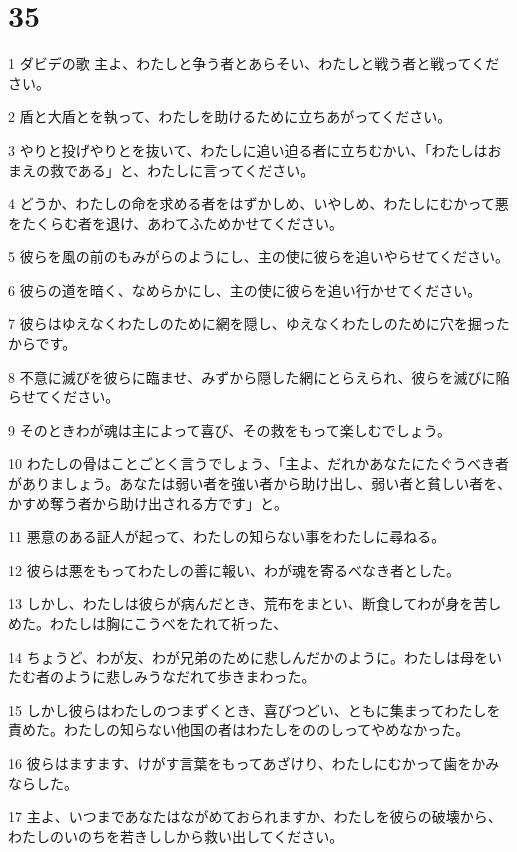 \chapter{35}

\par 1 ダビデの歌 主よ、わたしと争う者とあらそい、わたしと戦う者と戦ってください。
\par 2 盾と大盾とを執って、わたしを助けるために立ちあがってください。
\par 3 やりと投げやりとを抜いて、わたしに追い迫る者に立ちむかい、「わたしはおまえの救である」と、わたしに言ってください。
\par 4 どうか、わたしの命を求める者をはずかしめ、いやしめ、わたしにむかって悪をたくらむ者を退け、あわてふためかせてください。
\par 5 彼らを風の前のもみがらのようにし、主の使に彼らを追いやらせてください。
\par 6 彼らの道を暗く、なめらかにし、主の使に彼らを追い行かせてください。
\par 7 彼らはゆえなくわたしのために網を隠し、ゆえなくわたしのために穴を掘ったからです。
\par 8 不意に滅びを彼らに臨ませ、みずから隠した網にとらえられ、彼らを滅びに陥らせてください。
\par 9 そのときわが魂は主によって喜び、その救をもって楽しむでしょう。
\par 10 わたしの骨はことごとく言うでしょう、「主よ、だれかあなたにたぐうべき者がありましょう。あなたは弱い者を強い者から助け出し、弱い者と貧しい者を、かすめ奪う者から助け出される方です」と。
\par 11 悪意のある証人が起って、わたしの知らない事をわたしに尋ねる。
\par 12 彼らは悪をもってわたしの善に報い、わが魂を寄るべなき者とした。
\par 13 しかし、わたしは彼らが病んだとき、荒布をまとい、断食してわが身を苦しめた。わたしは胸にこうべをたれて祈った、
\par 14 ちょうど、わが友、わが兄弟のために悲しんだかのように。わたしは母をいたむ者のように悲しみうなだれて歩きまわった。
\par 15 しかし彼らはわたしのつまずくとき、喜びつどい、ともに集まってわたしを責めた。わたしの知らない他国の者はわたしをののしってやめなかった。
\par 16 彼らはますます、けがす言葉をもってあざけり、わたしにむかって歯をかみならした。
\par 17 主よ、いつまであなたはながめておられますか、わたしを彼らの破壊から、わたしのいのちを若きししから救い出してください。
